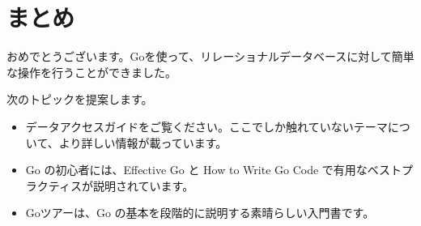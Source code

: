 \section{まとめ}

おめでとうございます。Goを使って、リレーショナルデータベースに対して簡単な操作を行うことができました。

次のトピックを提案します。

\begin{itemize}
\item
  データアクセスガイドをご覧ください。ここでしか触れていないテーマについて、より詳しい情報が載っています。
\item
  Go の初心者には、Effective Go と How to Write Go Code
  で有用なベストプラクティスが説明されています。
\item
  Goツアーは、Go の基本を段階的に説明する素晴らしい入門書です。
\end{itemize}





\begin{lstlisting}[numbers=none]

\end{lstlisting}

\begin{enumerate}
\end{enumerate}

\begin{itemize}
\end{itemize}

